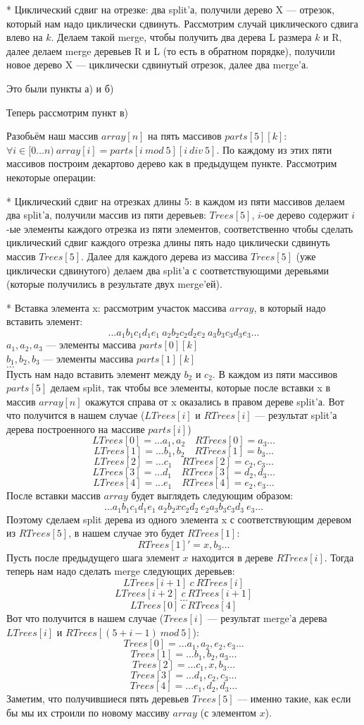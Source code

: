 \documentclass{article}
\begin{document}
* Циклический сдвиг на отрезке: два split'а, получили дерево X --- отрезок, который нам надо циклически сдвинуть. Рассмотрим случай циклического сдвига влево на $k$. Делаем такой merge, чтобы получить два дерева L размера $k$ и R, далее делаем merge деревьев R и L (то есть в обратном порядке), получили новое дерево X --- циклически сдвинутый отрезок, далее два merge'а.

Это были пункты а) и б)

Теперь рассмотрим пункт в)

Разобьём наш массив $array[n]$ на пять массивов $parts[5][k]$: $\forall i\in[0 \ldots n)\ array[i] = parts[i\ mod\ 5][i\ div\ 5]$. По каждому из этих пяти массивов построим декартово дерево как в предыдущем пункте. Рассмотрим некоторые операции:

* Циклический сдвиг на отрезках длины 5: в каждом из пяти массивов делаем два split'а, получили массив из пяти деревьев: $Trees[5]$, $i$-ое дерево содержит $i$-ые элементы каждого отрезка из пяти элементов, соответственно чтобы сделать циклический сдвиг каждого отрезка длины пять надо циклически сдвинуть массив $Trees[5]$. Далее для каждого дерева из массива $Trees[5]$ (уже циклически сдвинутого) делаем два split'а с соответствующими деревьями (которые получились в результате двух merge'ей).

* Вставка элемента x: рассмотрим участок массива $array$, в который надо вставить элемент: 
$$\ldots a_1b_1c_1d_1e_1\ a_2b_2c_2d_2e_2\ a_3b_3c_3d_3e_3 \ldots$$ $a_1,a_2,a_3$ --- элементы массива $parts[0][k]$\\ 
$b_1,b_2,b_3$ --- элементы массива $parts[1][k]$\\
$\ldots$\\
Пусть нам надо вставить элемент между $b_2$ и $c_2$. В каждом из пяти массивов $parts[5]$ делаем split, так чтобы все элементы, которые после вставки x в массив $array[n]$ окажутся справа от x оказались в правом дереве split'а. Вот что получится в нашем случае ($LTrees[i]$ и $RTrees[i]$ --- результат split'а дерева построенного на массиве $parts[i]$)
$$LTrees[0] = \ldots a_1,a_2\quad RTrees[0] = a_3\ldots$$
$$LTrees[1] = \ldots b_1,b_2\quad RTrees[1] = b_3\ldots$$
$$LTrees[2] = \ldots c_1\quad RTrees[2] = c_2,c_3\ldots$$
$$LTrees[3] = \ldots d_1\quad RTrees[3] = d_2,d_3\ldots$$
$$LTrees[4] = \ldots e_1\quad RTrees[4] = e_2,e_3\ldots$$
После вставки массив $array$ будет выглядеть следующим образом:
$$\ldots a_1b_1c_1d_1e_1\ a_2b_2xc_2d_2\ e_2a_3b_3c_3d_3\ e_3 \ldots$$
Поэтому сделаем split дерева из одного элемента x с соответствующим деревом из $RTrees[5]$, в нашем случае это будет $RTrees[1]$:
$$RTrees[1]' = x,b_3\ldots$$
Пусть после предыдущего шага элемент $x$ находится в дереве $RTrees[i]$. Тогда теперь нам надо сделать merge следующих деревьев: 
$$LTrees[i+1]\ c\ RTrees[i]$$
$$LTrees[i+2]\ c\ RTrees[i+1]$$
$$\ldots$$
$$LTrees[0]\ c\ RTrees[4]$$
Вот что получится в нашем случае ($Trees[i]$ --- результат merge'а дерева $LTrees[i]$ и $RTrees[(5+i-1)\ mod\ 5]$):
$$Trees[0] = \ldots a_1,a_2,e_2,e_3\ldots$$
$$Trees[1] = \ldots b_1,b_2,a_3\ldots$$
$$Trees[2] = \ldots c_1,x,b_3\ldots$$
$$Trees[3] = \ldots d_1,c_2,c_3\ldots$$
$$Trees[4] = \ldots e_1,d_2,d_3\ldots$$
Заметим, что получившиеся пять деревьев $Trees[5]$ --- именно такие, как если бы мы их строили по новому массиву $array$ (с элементом $x$).
\end{document}
